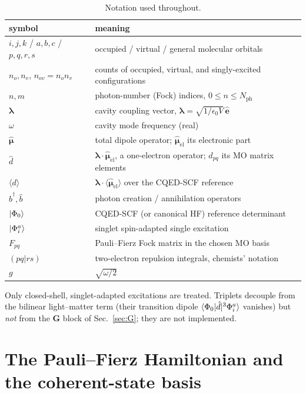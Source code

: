 \documentclass[11pt]{article}
\newcommand{\lam}{\bm{\lambda}}
\newcommand{\dop}{\hat{d}}                      %
\newcommand{\dexp}{\langle d \rangle}
\newcommand{\nph}{N_{\mathrm{ph}}}
\newcommand{\nov}{n_{ov}}
\newcommand{\nocc}{n_{o}}
\newcommand{\nvir}{n_{v}}
\newcommand{\bd}{\hat{b}^{\dagger}}
\newcommand{\bo}{\hat{b}}
\begin{document}
\begin{table}[h]
\centering
\small
\begin{tabular}{@{}ll@{}}
\toprule
symbol & meaning \\
\midrule
$i,j,k$ / $a,b,c$ / $p,q,r,s$ & occupied / virtual / general molecular orbitals \\
$\nocc, \nvir$, $\nov=\nocc\nvir$ & counts of occupied, virtual, and singly-excited configurations \\
$n,m$ & photon-number (Fock) indices, $0 \le n \le \nph$ \\
$\lam$ & cavity coupling vector, $\lam = \sqrt{1/\epsilon_0 V}\,\hat{\bm{e}}$ \\
$\omega$ & cavity mode frequency (real) \\
$\hat{\bm{\mu}}$ & total dipole operator; $\hat{\bm{\mu}}_{\mathrm{el}}$ its electronic part \\
$\dop$ & $\lam\cdot\hat{\bm{\mu}}_{\mathrm{el}}$, a one-electron operator; $d_{pq}$ its MO matrix elements \\
$\dexp$ & $\lam\cdot\langle\hat{\bm{\mu}}_{\mathrm{el}}\rangle$ over the CQED-SCF reference \\
$\bd, \bo$ & photon creation / annihilation operators \\
$\ket{\Phi_0}$ & CQED-SCF (or canonical HF) reference determinant \\
$\ket{\Phi_i^a}$ & singlet spin-adapted single excitation \\
$F_{pq}$ & Pauli--Fierz Fock matrix in the chosen MO basis \\
$(pq|rs)$ & two-electron repulsion integrals, chemists' notation \\
$g$ & $\sqrt{\omega/2}$ \\
\bottomrule
\end{tabular}
\caption{Notation used throughout.}
\end{table}

Only closed-shell, singlet-adapted excitations are treated. Triplets decouple
from the bilinear light--matter term (their transition dipole
$\braket{\Phi_0 | \dop | {}^3\Phi_i^a}$ vanishes) but \emph{not} from the
$\bm{G}$ block of Sec.~\ref{sec:G}; they are not implemented.

\section{The Pauli--Fierz Hamiltonian and the coherent-state basis}
\end{document}

